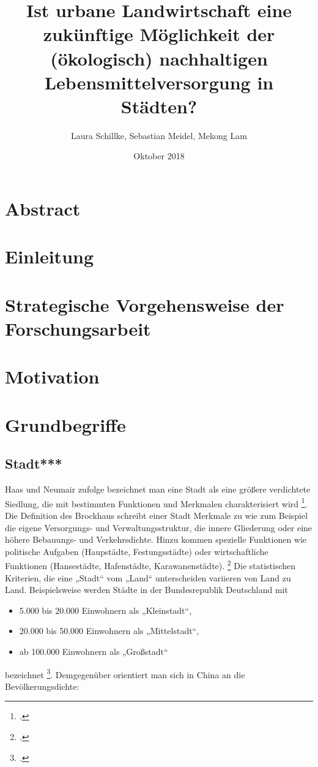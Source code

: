 \documentclass{scrartcl}
\title{Ist urbane Landwirtschaft eine zukünftige Möglichkeit der (ökologisch) nachhaltigen Lebensmittelversorgung in Städten?}
\author{Laura Schillke, Sebastian Meidel, Mekong Lam }
\date{Oktober 2018}
\begin{document}
\maketitle


\newpage

\setcounter{tocdepth}{2}
\tableofcontents 



\newpage

\section{Abstract}

\section{Einleitung}

\section{Strategische Vorgehensweise der Forschungsarbeit}

\section{Motivation}

\section{Grundbegriffe}

\subsection{Stadt***}

Haas und Neumair zufolge bezeichnet man eine Stadt als eine größere verdichtete Siedlung, die mit bestimmten Funktionen und Merkmalen charakterisiert wird \footcite{HaasDefinitionWirtschaftslexikon}. Die Definition des Brockhaus schreibt einer Stadt Merkmale zu wie zum Beispiel die eigene Versorgungs- und Verwaltungsstruktur, die innere Gliederung oder eine höhere Bebauungs- und Verkehrsdichte. Hinzu kommen spezielle Funktionen wie politische Aufgaben (Haupstädte, Festungsstädte) oder wirtschaftliche Funktionen (Hansestädte, Hafenstädte, Karawanenstädte). \footcite{BrockhausStadt} Die statistischen Kriterien, die eine „Stadt“ vom „Land“ unterscheiden variieren von Land zu Land. Beispielsweise werden Städte in der Bundesrepublik Deutschland mit 
\begin{itemize}
\item 5.000 bis 20.000 Einwohnern als „Kleinstadt“,
\item 20.000 bis 50.000 Einwohnern als „Mittelstadt“,
\item ab 100.000 Einwohnern als „Großstadt“ 
\end{itemize}
bezeichnet \footcite{Institutinternationaldestatistique1887BulletinStatistique}. Demgegenüber orientiert man sich in China an die Bevölkerungsdichte: 
\end{document}
